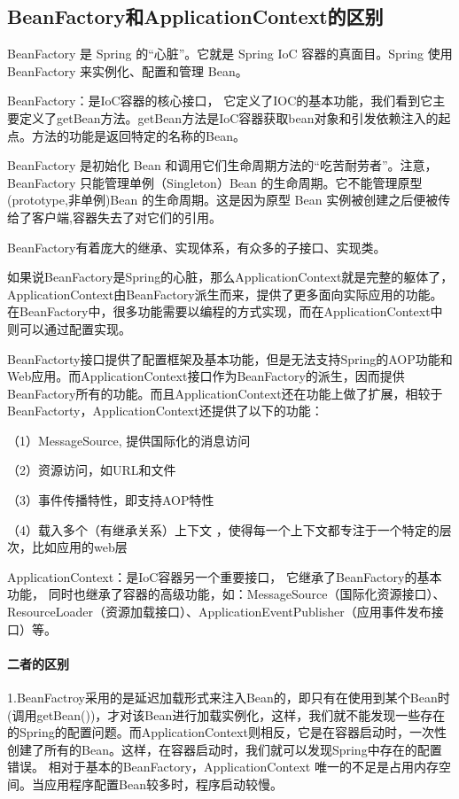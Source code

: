 \documentclass[../../../interview-questions.tex]{subfiles}
\begin{document}
\subsection{BeanFactory和ApplicationContext的区别}

BeanFactory 是 Spring 的“心脏”。它就是 Spring IoC 容器的真面目。Spring 使用 BeanFactory 来实例化、配置和管理 Bean。

BeanFactory：是IoC容器的核心接口， 它定义了IOC的基本功能，我们看到它主要定义了getBean方法。getBean方法是IoC容器获取bean对象和引发依赖注入的起点。方法的功能是返回特定的名称的Bean。

BeanFactory 是初始化 Bean 和调用它们生命周期方法的“吃苦耐劳者”。注意，BeanFactory 只能管理单例（Singleton）Bean 的生命周期。它不能管理原型(prototype,非单例)Bean 的生命周期。这是因为原型 Bean 实例被创建之后便被传给了客户端,容器失去了对它们的引用。

BeanFactory有着庞大的继承、实现体系，有众多的子接口、实现类。


如果说BeanFactory是Spring的心脏，那么ApplicationContext就是完整的躯体了，ApplicationContext由BeanFactory派生而来，提供了更多面向实际应用的功能。在BeanFactory中，很多功能需要以编程的方式实现，而在ApplicationContext中则可以通过配置实现。

BeanFactorty接口提供了配置框架及基本功能，但是无法支持Spring的AOP功能和Web应用。而ApplicationContext接口作为BeanFactory的派生，因而提供BeanFactory所有的功能。而且ApplicationContext还在功能上做了扩展，相较于BeanFactorty，ApplicationContext还提供了以下的功能： 

（1）MessageSource, 提供国际化的消息访问

（2）资源访问，如URL和文件 

（3）事件传播特性，即支持AOP特性

（4）载入多个（有继承关系）上下文 ，使得每一个上下文都专注于一个特定的层次，比如应用的web层 

ApplicationContext：是IoC容器另一个重要接口， 它继承了BeanFactory的基本功能， 同时也继承了容器的高级功能，如：MessageSource（国际化资源接口）、ResourceLoader（资源加载接口）、ApplicationEventPublisher（应用事件发布接口）等。

\paragraph{二者的区别}

1.BeanFactroy采用的是延迟加载形式来注入Bean的，即只有在使用到某个Bean时(调用getBean())，才对该Bean进行加载实例化，这样，我们就不能发现一些存在的Spring的配置问题。而ApplicationContext则相反，它是在容器启动时，一次性创建了所有的Bean。这样，在容器启动时，我们就可以发现Spring中存在的配置错误。 相对于基本的BeanFactory，ApplicationContext 唯一的不足是占用内存空间。当应用程序配置Bean较多时，程序启动较慢。
\end{document}
